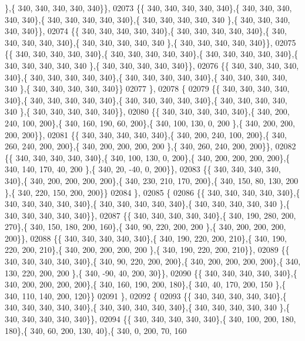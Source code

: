\begin{DoxyCode}
      \},\{ 340, 340, 340, 340, 340\}\},
02073 \{\{ 340, 340, 340, 340, 340\},\{ 340, 340, 340, 340, 340\},\{ 340, 340, 340, 340, 340\},\{ 340, 340, 340, 340, 340
      \},\{ 340, 340, 340, 340, 340\}\},
02074 \{\{ 340, 340, 340, 340, 340\},\{ 340, 340, 340, 340, 340\},\{ 340, 340, 340, 340, 340\},\{ 340, 340, 340, 340, 340
      \},\{ 340, 340, 340, 340, 340\}\},
02075 \{\{ 340, 340, 340, 340, 340\},\{ 340, 340, 340, 340, 340\},\{ 340, 340, 340, 340, 340\},\{ 340, 340, 340, 340, 340
      \},\{ 340, 340, 340, 340, 340\}\},
02076 \{\{ 340, 340, 340, 340, 340\},\{ 340, 340, 340, 340, 340\},\{ 340, 340, 340, 340, 340\},\{ 340, 340, 340, 340, 340
      \},\{ 340, 340, 340, 340, 340\}\}
02077 \},
02078 \{
02079 \{\{ 340, 340, 340, 340, 340\},\{ 340, 340, 340, 340, 340\},\{ 340, 340, 340, 340, 340\},\{ 340, 340, 340, 340, 340
      \},\{ 340, 340, 340, 340, 340\}\},
02080 \{\{ 340, 340, 340, 340, 340\},\{ 340, 200, 240, 100, 200\},\{ 340, 160, 190,  60, 200\},\{ 340, 100, 130,   0, 200
      \},\{ 340, 200, 200, 200, 200\}\},
02081 \{\{ 340, 340, 340, 340, 340\},\{ 340, 200, 240, 100, 200\},\{ 340, 260, 240, 200, 200\},\{ 340, 200, 200, 200, 200
      \},\{ 340, 260, 240, 200, 200\}\},
02082 \{\{ 340, 340, 340, 340, 340\},\{ 340, 100, 130,   0, 200\},\{ 340, 200, 200, 200, 200\},\{ 340, 140, 170,  40, 200
      \},\{ 340,  20, -40,   0, 200\}\},
02083 \{\{ 340, 340, 340, 340, 340\},\{ 340, 200, 200, 200, 200\},\{ 340, 230, 210, 170, 200\},\{ 340, 150,  80, 130, 200
      \},\{ 340, 220, 150, 200, 200\}\}
02084 \},
02085 \{
02086 \{\{ 340, 340, 340, 340, 340\},\{ 340, 340, 340, 340, 340\},\{ 340, 340, 340, 340, 340\},\{ 340, 340, 340, 340, 340
      \},\{ 340, 340, 340, 340, 340\}\},
02087 \{\{ 340, 340, 340, 340, 340\},\{ 340, 190, 280, 200, 270\},\{ 340, 150, 180, 200, 160\},\{ 340,  90, 220, 200, 200
      \},\{ 340, 200, 200, 200, 200\}\},
02088 \{\{ 340, 340, 340, 340, 340\},\{ 340, 190, 220, 200, 210\},\{ 340, 190, 220, 200, 210\},\{ 340, 200, 200, 200, 200
      \},\{ 340, 190, 220, 200, 210\}\},
02089 \{\{ 340, 340, 340, 340, 340\},\{ 340,  90, 220, 200, 200\},\{ 340, 200, 200, 200, 200\},\{ 340, 130, 220, 200, 200
      \},\{ 340, -90,  40, 200,  30\}\},
02090 \{\{ 340, 340, 340, 340, 340\},\{ 340, 200, 200, 200, 200\},\{ 340, 160, 190, 200, 180\},\{ 340,  40, 170, 200, 150
      \},\{ 340, 110, 140, 200, 120\}\}
02091 \},
02092 \{
02093 \{\{ 340, 340, 340, 340, 340\},\{ 340, 340, 340, 340, 340\},\{ 340, 340, 340, 340, 340\},\{ 340, 340, 340, 340, 340
      \},\{ 340, 340, 340, 340, 340\}\},
02094 \{\{ 340, 340, 340, 340, 340\},\{ 340, 100, 200, 180, 180\},\{ 340,  60, 200, 130,  40\},\{ 340,   0, 200,  70, 160

\end{DoxyCode}
